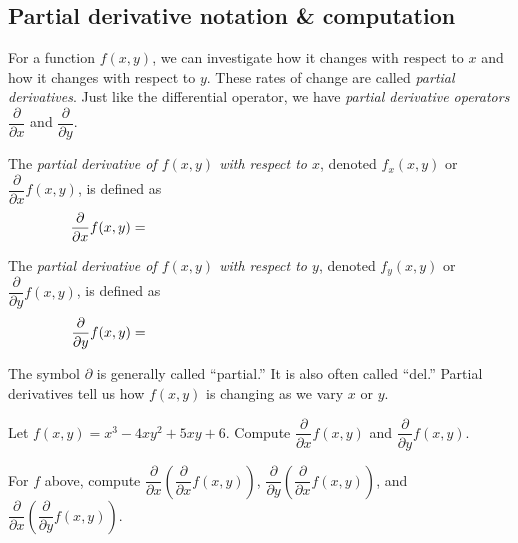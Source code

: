 \pagebreak 

\subsection{Partial derivative notation \& computation}
For a function $f(x,y)$, we can investigate how it changes with respect to $x$ and how it changes with respect to $y$. These rates of change are called \emph{partial derivatives}. Just like the differential operator, we have \emph{partial derivative operators} $\dfrac{\partial}{\partial x}$ and $\dfrac{\partial}{\partial y}$.

The \emph{partial derivative of $f(x,y)$ with respect to $x$}, denoted $f_x(x,y)$ or $\dfrac{\partial}{\partial x}f(x,y)$, is defined as 
\[
    \hspace{-1in}\dfrac{\partial}{\partial x}f(x,y)=\hspace{2in}
\]

The \emph{partial derivative of $f(x,y)$ with respect to $y$}, denoted $f_y(x,y)$ or $\dfrac{\partial}{\partial y}f(x,y)$, is defined as 
\[
    \hspace{-1in}\dfrac{\partial}{\partial y}f(x,y)=\hspace{2in}
\]

The symbol $\partial$ is generally called ``partial.'' It is also often called ``del.''  Partial derivatives tell us how $f(x,y)$ is changing as we vary $x$ or $y$. \\

{\centering 
\par}
\begin{ex}
    Let $f(x,y)=x^3-4xy^2+5xy+6$. Compute $\dfrac{\partial}{\partial x}f(x,y)$ and $\dfrac{\partial}{\partial y}f(x,y)$.
\end{ex}

\vfill\vfill

\begin{ex}
    For $f$ above, compute $\dfrac{\partial}{\partial x}\left(\dfrac{\partial}{\partial x}f(x,y)\right)$, $\dfrac{\partial}{\partial y}\left(\dfrac{\partial}{\partial x}f(x,y)\right)$, and $\dfrac{\partial}{\partial x}\left(\dfrac{\partial}{\partial y}f(x,y)\right)$.
\end{ex}

